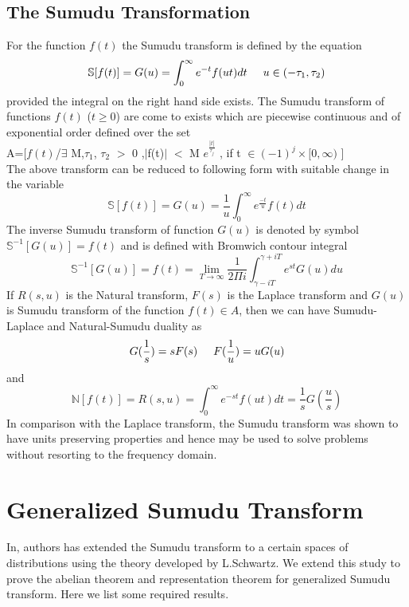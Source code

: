 \subsection{The Sumudu Transformation}
For the function $f(t)$ the Sumudu transform is defined by the equation \cite{R90}
\begin{equation}
\mathbb{S}[f(t)] = G(u) = \int_{0}^{\infty}e^{-t}f(ut)dt   \hspace{0.5 cm} u \in (-\tau_{1}, \tau_{2})
 \end{equation} 
provided the integral on the right hand side exists. The Sumudu transform of functions $ f(t)$ ($t\geq 0 $) are come to exists which are piecewise continuous and of exponential order defined over the set\\
 A=[$f(t)$/$\exists$ M,$\tau_{1}$, $\tau_{2}$ $>$ 0 ,$|$f(t)$|$ $<$ M $e^{\frac{|t|}{\tau_{j}}}$ , if t $\in(-1)^{j}\times[0,\infty)$ ]\\
The above transform can be reduced to following form with suitable change in the variable
 \begin{equation}
 \mathbb{S}[f(t)] = G(u) = \frac{1}{u}\int_{0}^{\infty}e^{\frac{-t}{u}}f(t)dt   
 \end{equation}
 The inverse Sumudu transform of function $ G(u)$ is denoted by symbol $\mathbb{S}^{-1}[G(u)]= f(t)$ and is defined with Bromwich contour integral\cite{R60}
 \begin{equation}
 \mathbb{S}^{-1}[G(u)] = f(t) = \lim _{T\rightarrow\infty} \frac{1}{2\Pi i}\int_{\gamma-iT}^{\gamma+iT}e^{st}G(u)du
 \end{equation}
If $R(s,u)$ is the Natural transform, $F(s)$ is the Laplace transform and $G(u)$ is Sumudu transform of the function $f(t) \in A $, then we can have Sumudu-Laplace and Natural-Sumudu duality as
 \begin{equation}
G(\frac{1}{s})=sF(s) \hspace{0.5cm} F(\frac{1}{u})=uG(u)
 \end{equation}
 and
  \begin{equation}
\mathbb{N}[f(t)] = R(s,u) = \int_{0}^{\infty}e^{-st}f(ut)dt =\frac{1}{s}G(\frac{u}{s})
 \end{equation}
 In comparison with the Laplace transform, the Sumudu transform was shown to have units preserving properties and hence may be used to solve problems without resorting to the frequency domain.
\section{Generalized Sumudu Transform}
        In\cite{R42}, authors has extended the Sumudu transform to a certain spaces of distributions using the theory developed by L.Schwartz\cite{R72,R73}. We extend this study to prove the abelian theorem and representation theorem for generalized Sumudu transform. Here we list some required results.
